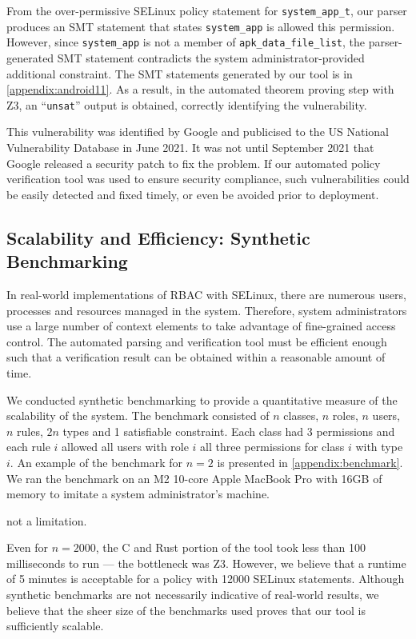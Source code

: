 \documentclass[acmsmall,screen,nonacm]{acmart}
\begin{document}
From the over-permissive SELinux policy statement for \texttt{system\_app\_t}, 
our parser produces an SMT statement that states \texttt{system\_app} is 
allowed this permission. However, since \texttt{system\_app} is not a member of 
\texttt{apk\_data\_file\_list}, the parser-generated SMT statement contradicts 
the system administrator-provided additional constraint. The SMT statements 
generated by our tool is in \autoref{appendix:android11}. As a result, in the 
automated theorem proving step with Z3, an ``\texttt{unsat}'' output is 
obtained, correctly identifying the vulnerability.

This vulnerability was identified by Google and publicised to the US National 
Vulnerability Database in June 2021. It was not until September 2021 that 
Google released a security patch to fix the problem. If our automated policy 
verification tool was used to ensure security compliance, such vulnerabilities 
could be easily detected and fixed timely, or even be avoided prior to 
deployment.

\subsection{Scalability and Efficiency: Synthetic Benchmarking}

In real-world implementations of RBAC with SELinux, there are numerous users, 
processes and resources managed in the system. Therefore, system administrators 
use a large number of context elements to take advantage of fine-grained access 
control. The automated parsing and verification tool must be efficient enough 
such that a verification result can be obtained within a reasonable amount of 
time.

We conducted synthetic benchmarking to provide a quantitative measure of the 
scalability of the system. The benchmark consisted of $n$ classes, $n$ roles, 
$n$ users, $n$ rules, $2n$ types and 1 satisfiable constraint. Each class had 3 
permissions and each rule $i$ allowed all users with role $i$ all three 
permissions for class $i$ with type $i$. An example of the benchmark for $n = 
2$ is presented in \autoref{appendix:benchmark}. We ran the benchmark on an M2 
10-core Apple MacBook Pro with 16GB of memory to imitate a system 
administrator's machine.

not a limitation.



Even for $n = 2000$, the C and Rust portion of the tool took less than 100 
milliseconds to run --- the bottleneck was Z3. However, we believe that a 
runtime of 5 minutes is acceptable for a policy with 12000 SELinux statements. 
Although synthetic benchmarks are not necessarily indicative of real-world 
results, we believe that the sheer size of the benchmarks used proves that our 
tool is sufficiently scalable.
\end{document}
